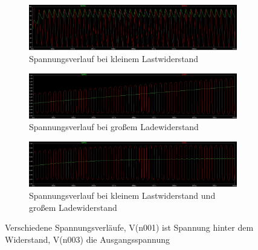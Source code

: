\begin{figure}
	\centering
	\begin{subfigure}[b]{\textwidth}
		\centering
		\includegraphics[width=\textwidth]{data/kleinLast}
		\caption{Spannungsverlauf bei kleinem Lastwiderstand}
		\label{kleinLast}
	\end{subfigure}
	\begin{subfigure}[b]{\textwidth}
		\centering
		\includegraphics[width=\textwidth]{data/grossEin}
		\caption{Spannungsverlauf bei großem Ladewiderstand}
		\label{grossEin}
	\end{subfigure}
	\begin{subfigure}[b]{\textwidth}
		\centering
		\includegraphics[width=\textwidth]{data/grossEin_kleinLast}
		\caption{Spannungsverlauf bei kleinem Lastwiderstand und großem Ladewiderstand}
		\label{groKlein}
	\end{subfigure}
\caption{Verschiedene Spannungsverläufe, V(n001) ist Spannung hinter dem Widerstand, V(n003) die Ausgangsspannung}
\end{figure}